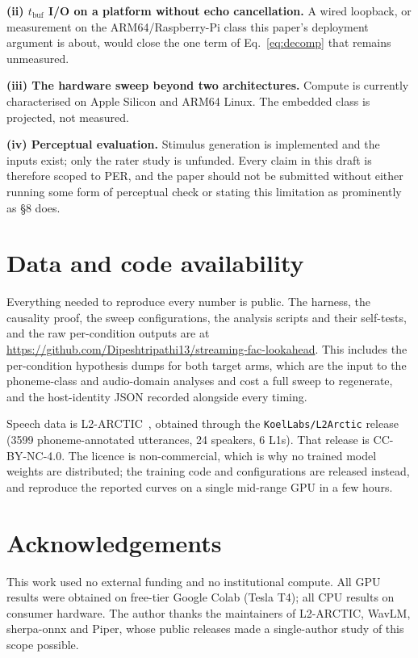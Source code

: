 \documentclass[9pt,a4paper,twocolumn]{article}
\newcommand{\tbuf}{\ensuremath{t_{\mathrm{buf}}}}
\begin{document}
\textbf{(ii) \tbuf{} I/O on a platform without echo cancellation.} A wired
loopback, or measurement on the ARM64/Raspberry-Pi class this paper's
deployment argument is about, would close the one term of
Eq.~\ref{eq:decomp} that remains unmeasured.

\textbf{(iii) The hardware sweep beyond two architectures.} Compute is
currently characterised on Apple Silicon and ARM64 Linux. The embedded class is
projected, not measured.

\textbf{(iv) Perceptual evaluation.} Stimulus generation is implemented and the
inputs exist; only the rater study is unfunded. Every claim in this draft is
therefore scoped to PER, and the paper should not be submitted without either
running some form of perceptual check or stating this limitation as
prominently as \S8 does.

\section{Data and code availability}

Everything needed to reproduce every number is public. The harness, the
causality proof, the sweep configurations, the analysis scripts and their
self-tests, and the raw per-condition outputs are at
\url{https://github.com/Dipeshtripathi13/streaming-fac-lookahead}. This
includes the per-condition hypothesis dumps for both target arms, which are the
input to the phoneme-class and audio-domain analyses and cost a full sweep to
regenerate, and the host-identity JSON recorded alongside every timing.

Speech data is L2-ARCTIC~\cite{l2arctic2018}, obtained through the
\texttt{KoelLabs/L2Arctic} release (3599 phoneme-annotated utterances,
24 speakers, 6 L1s). That release is CC-BY-NC-4.0. The licence is
non-commercial, which is why no trained model weights are distributed; the
training code and configurations are released instead, and reproduce the
reported curves on a single mid-range GPU in a few hours.

\section{Acknowledgements}

This work used no external funding and no institutional compute. All GPU
results were obtained on free-tier Google Colab (Tesla T4); all CPU results on
consumer hardware. The author thanks the maintainers of L2-ARCTIC, WavLM,
sherpa-onnx and Piper, whose public releases made a single-author study of this
scope possible.
\end{document}
